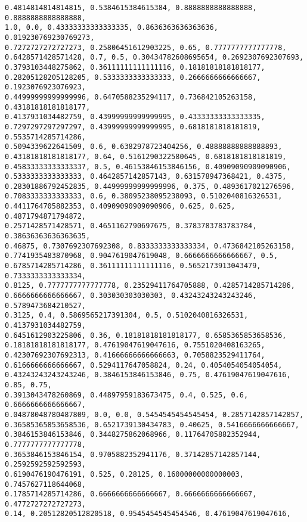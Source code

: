 \documentclass[11pt]{article}
\begin{document}
\begin{Verbatim}[commandchars=\\\{\}]
0.4814814814814815, 0.5384615384615384, 0.8888888888888888, 0.8888888888888888,
1.0, 0.0, 0.43333333333333335, 0.8636363636363636, 0.019230769230769273,
0.7272727272727273, 0.25806451612903225, 0.65, 0.7777777777777778,
0.6428571428571428, 0.7, 0.5, 0.30434782608695654, 0.2692307692307693,
0.3793103448275862, 0.36111111111111116, 0.18181818181818177,
0.28205128205128205, 0.5333333333333333, 0.2666666666666667, 0.1923076923076923,
0.44999999999999996, 0.6470588235294117, 0.736842105263158, 0.43181818181818177,
0.4137931034482759, 0.43999999999999995, 0.43333333333333335,
0.7297297297297297, 0.43999999999999995, 0.6818181818181819, 0.5535714285714286,
0.5094339622641509, 0.6, 0.6382978723404256, 0.48888888888888893,
0.43181818181818177, 0.64, 0.5161290322580645, 0.6818181818181819,
0.45833333333333337, 0.5, 0.46153846153846156, 0.40909090909090906,
0.5333333333333333, 0.4642857142857143, 0.631578947368421, 0.4375,
0.28301886792452835, 0.44999999999999996, 0.375, 0.4893617021276596,
0.7083333333333333, 0.6, 0.38095238095238093, 0.5102040816326531,
0.4411764705882353, 0.40909090909090906, 0.625, 0.625, 0.4871794871794872,
0.2571428571428571, 0.4651162790697675, 0.3783783783783784, 0.38636363636363635,
0.46875, 0.7307692307692308, 0.8333333333333334, 0.4736842105263158,
0.7741935483870968, 0.9047619047619048, 0.6666666666666667, 0.5,
0.6785714285714286, 0.36111111111111116, 0.5652173913043479, 0.7333333333333334,
0.8125, 0.7777777777777778, 0.23529411764705888, 0.4285714285714286,
0.6666666666666667, 0.303030303030303, 0.43243243243243246, 0.5789473684210527,
0.3125, 0.4, 0.5869565217391304, 0.5, 0.5102040816326531, 0.4137931034482759,
0.6451612903225806, 0.36, 0.18181818181818177, 0.6585365853658536,
0.18181818181818177, 0.47619047619047616, 0.7551020408163265,
0.42307692307692313, 0.41666666666666663, 0.7058823529411764,
0.6166666666666667, 0.5294117647058824, 0.24, 0.4054054054054054,
0.43243243243243246, 0.3846153846153846, 0.75, 0.47619047619047616, 0.85, 0.75,
0.3913043478260869, 0.44897959183673475, 0.4, 0.525, 0.6, 0.6666666666666667,
0.04878048780487809, 0.0, 0.0, 0.5454545454545454, 0.2857142857142857,
0.36585365853658536, 0.6521739130434783, 0.40625, 0.5416666666666667,
0.3846153846153846, 0.3448275862068966, 0.11764705882352944, 0.7777777777777778,
0.3653846153846154, 0.9705882352941176, 0.37142857142857144, 0.2592592592592593,
0.6190476190476191, 0.525, 0.28125, 0.16000000000000003, 0.7457627118644068,
0.1785714285714286, 0.6666666666666667, 0.6666666666666667, 0.4772727272727273,
0.14, 0.20512820512820518, 0.9545454545454546, 0.47619047619047616,

\end{Verbatim}
\end{document}
